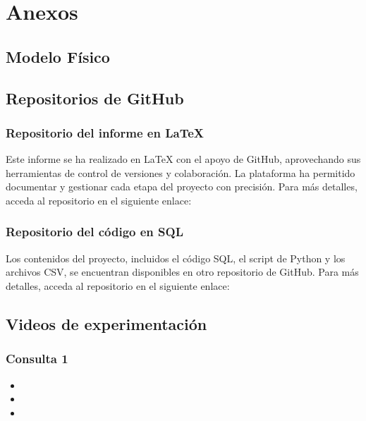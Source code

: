 \section{Anexos}
\subsection{Modelo Físico}
\subsection{Repositorios de GitHub}
\subsubsection{Repositorio del informe en LaTeX}{
    Este informe se ha realizado en LaTeX con el apoyo de GitHub, aprovechando sus herramientas de control de versiones y colaboración. La plataforma ha permitido documentar y gestionar cada etapa del proyecto con precisión. Para más detalles, acceda al repositorio en el siguiente enlace: 
}
\subsubsection{Repositorio del código en SQL}{
    Los contenidos del proyecto, incluidos el código SQL, el script de Python y los archivos CSV, se encuentran disponibles en otro repositorio de GitHub. Para más detalles, acceda al repositorio en el siguiente enlace: 
}
\subsection{Videos de experimentación}
\subsubsection{Consulta 1}
\begin{itemize}
    \item{}
    \item{}
    \item{}
\end{itemize}
